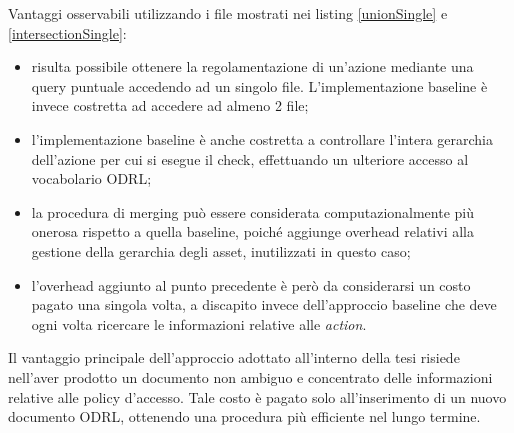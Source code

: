 \documentclass[12pt,a4paper,twoside]{book}
\begin{document}
Vantaggi osservabili utilizzando i file mostrati nei listing \ref{unionSingle} e \ref{intersectionSingle}:
\begin{itemize}
\item risulta possibile ottenere la regolamentazione di un'azione mediante una query puntuale accedendo ad un singolo file. L'implementazione baseline è invece costretta ad accedere ad almeno 2 file;
\item l'implementazione baseline è anche costretta a controllare l'intera gerarchia dell'azione per cui si esegue il check, effettuando un ulteriore accesso al vocabolario ODRL;
\item la procedura di merging può essere considerata computazionalmente più onerosa rispetto a quella baseline, poiché aggiunge overhead relativi alla gestione della gerarchia degli asset, inutilizzati in questo caso;
\item l'overhead aggiunto al punto precedente è però da considerarsi un costo pagato una singola volta, a discapito invece dell'approccio baseline che deve ogni volta ricercare le informazioni relative alle \textit{action}.
\end{itemize}
Il vantaggio principale dell'approccio adottato all'interno della tesi risiede nell'aver prodotto un documento non ambiguo e concentrato delle informazioni relative alle policy d'accesso. Tale costo è pagato solo all'inserimento di un nuovo documento ODRL, ottenendo una procedura più efficiente nel lungo termine.
\end{document}
